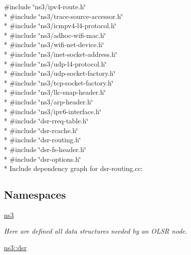 {\ttfamily \#include \char`\"{}ns3/ipv4-\/route.\+h\char`\"{}}\\*
{\ttfamily \#include \char`\"{}ns3/trace-\/source-\/accessor.\+h\char`\"{}}\\*
{\ttfamily \#include \char`\"{}ns3/icmpv4-\/l4-\/protocol.\+h\char`\"{}}\\*
{\ttfamily \#include \char`\"{}ns3/adhoc-\/wifi-\/mac.\+h\char`\"{}}\\*
{\ttfamily \#include \char`\"{}ns3/wifi-\/net-\/device.\+h\char`\"{}}\\*
{\ttfamily \#include \char`\"{}ns3/inet-\/socket-\/address.\+h\char`\"{}}\\*
{\ttfamily \#include \char`\"{}ns3/udp-\/l4-\/protocol.\+h\char`\"{}}\\*
{\ttfamily \#include \char`\"{}ns3/udp-\/socket-\/factory.\+h\char`\"{}}\\*
{\ttfamily \#include \char`\"{}ns3/tcp-\/socket-\/factory.\+h\char`\"{}}\\*
{\ttfamily \#include \char`\"{}ns3/llc-\/snap-\/header.\+h\char`\"{}}\\*
{\ttfamily \#include \char`\"{}ns3/arp-\/header.\+h\char`\"{}}\\*
{\ttfamily \#include \char`\"{}ns3/ipv6-\/interface.\+h\char`\"{}}\\*
{\ttfamily \#include \char`\"{}dsr-\/rreq-\/table.\+h\char`\"{}}\\*
{\ttfamily \#include \char`\"{}dsr-\/rcache.\+h\char`\"{}}\\*
{\ttfamily \#include \char`\"{}dsr-\/routing.\+h\char`\"{}}\\*
{\ttfamily \#include \char`\"{}dsr-\/fs-\/header.\+h\char`\"{}}\\*
{\ttfamily \#include \char`\"{}dsr-\/options.\+h\char`\"{}}\\*
Include dependency graph for dsr-\/routing.cc\+:
\subsection*{Namespaces}
\begin{DoxyCompactItemize}
\item 
 \hyperlink{namespacens3}{ns3}
\begin{DoxyCompactList}\small\item\em Here are defined all data structures needed by an O\+L\+SR node. \end{DoxyCompactList}\item 
 \hyperlink{namespacens3_1_1dsr}{ns3\+::dsr}
\end{DoxyCompactItemize}
